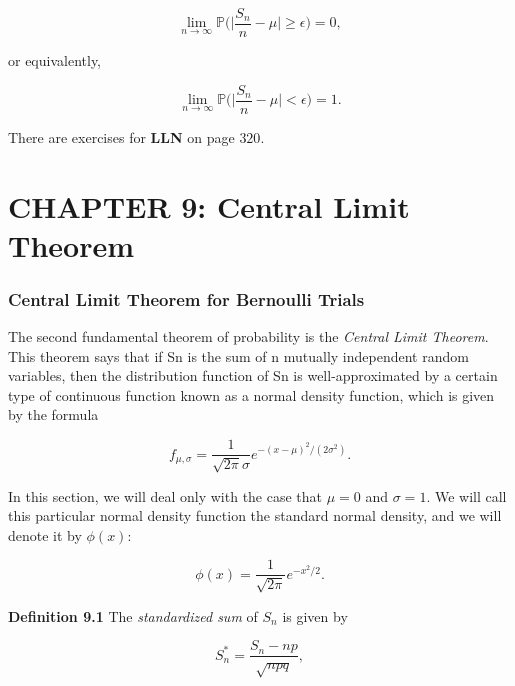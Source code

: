 \documentclass[12pt]{article}
\begin{document}
\begin{equation*}
\lim_{n \rightarrow \infty} \mathbb{P} \Bigg ( \Bigg \lvert \frac{S_n}{n} - \mu \Bigg \rvert \geq \epsilon \Bigg ) = 0,
\end{equation*}

\noindent
or equivalently,

\begin{equation*}
\lim_{n \rightarrow \infty} \mathbb{P} \Bigg ( \Bigg \lvert \frac{S_n}{n} - \mu \Bigg \rvert < \epsilon \Bigg ) = 1.
\end{equation*}

\noindent
There are exercises for \textbf{LLN} on page $320$.


\section*{CHAPTER 9: Central Limit Theorem}
\subsubsection*{Central Limit Theorem for Bernoulli Trials}
\noindent
The second fundamental theorem of probability is the \textit{Central Limit Theorem}. This theorem says that if Sn is the sum of n mutually independent random variables, then the distribution function of Sn is well-approximated by a certain type of continuous function known as a normal density function, which is given by the formula

\begin{equation*}
f_{\mu, \sigma} = \frac{1}{\sqrt{2 \pi} \sigma} e^{-(x - \mu)^2 / (2 \sigma^2)}.
\end{equation*}

In this section, we will deal only with the case that $\mu = 0$ and $\sigma = 1$. We will call this particular normal density function the standard normal density, and we will denote it by $\phi (x)$: 

\begin{equation*}
\phi (x) = \frac{1}{\sqrt{2 \pi}} e^{-x^2 / 2}.
\end{equation*}

\noindent
\textbf{Definition 9.1} The \textit{standardized sum} of $S_n$ is given by 

\begin{equation*}
S_n^* = \frac{S_n - np}{\sqrt{npq}},
\end{equation*}
\end{document}
